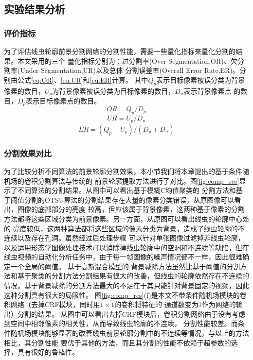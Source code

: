 \subsection{实验结果分析}
\subsubsection{评价指标}
	为了评估线虫轮廓前景分割网络的分割性能，需要一些量化指标来量化分割的结果。本文采用的三个
	量化指标分别为：过分割率(Over Segmentation,OR)、欠分割率(Under Segmentation,UR)以及总体
	分割误差率(Overall Error Rate,ER)\cite{Liu2006Set}。分别由公式\ref{eq:OR}、\ref{eq:UR}和\ref{eq:ER}计算。
	其中$Q_p$表示目标像素被误分类为背景像素的数目，$U_p$为背景像素被误分类为目标像素的数目，$D_n$表示背景像素点
	的数目，$D_p$表示目标像素点的数目。
		\begin{equation}
		OR = Q_p/D_p \label{eq:OR}
		\end{equation}
		\begin{equation}
		UR = U_p/D_n \label{eq:UR}
		\end{equation}
		\begin{equation}
		ER = (Q_p+U_p)/(D_p+D_n)\label{eq:ER}
		\end{equation}
\subsubsection{分割效果对比}
	为了比较分析不同算法的前景轮廓分割效果，本小节我们将本章提出的基于条件随机场的卷积分割算法与传统的
	前景轮廓提取方法进行了对比。图\ref{fig:comp_res}显示了不同算法的分割结果。从图中可以看出基于模糊C均值聚类的
	分割方法和基于阈值分割的OTSU算法的分割结果存在大量的像素分类错误，从原图像可以看出，图像的底部部分的亮度
	较高，但应该属于背景像素，这两种基于像素的分割方法都将这些区域分类为前景像素。另一方面，从原图可以看出线虫的轮廓中心处的
	亮度较低，这两种算法都将这些区域的像素分类为背景，造成了线虫轮廓的不连续以及存在孔洞。虽然经过后处理步骤
	可以针对单张图像过滤掉非线虫轮廓，以及运用形态学图像处理技术可以消除掉线虫轮廓中的空洞和不连续等缺陷，但在
	线虫视频的自动化分析任务中，由于每一帧图像的噪声情况都不一样，因此很难确定一个全局的阈值。 基于高斯混合模型的
	背景减除方法虽然比基于阈值的分割方法和基于聚类的分割方法分割结果有很大的改善，但线虫的轮廓依然存在不连续的
	情况。基于背景减除的分割方法最大的不足在于其只能针对背景固定的视频，因此这种分割具有很大的局限性。
	图\ref{fig:comp_res}(f)是本文不带条件随机场模块的卷积网络（去掉CRF模块，同时用$1\times1$的卷积将特征的
	通道数变为1作为网络的输出）分割的结果。
	从图中可以看出去掉CRF模块后，卷积分割网络由于没有考虑到空间中相邻像素的相关性，从而导致线虫轮廓的不连续，
	分割性能较差。而条件随机场模块能够显著的改善线虫前景轮廓分割中的不连续等情况，与以上的方法相比，其分割性能
	要优于其他的方法，而且其分割的性能不依赖于超参数的选择，具有很好的鲁棒性。
	
